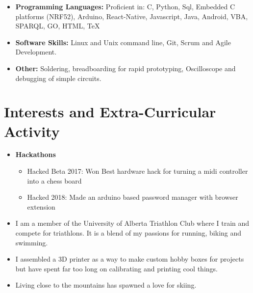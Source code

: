 \documentclass[11pt,a4paper,sans]{moderncv}        %
\begin{document}
\vspace{6pt}

\begin{itemize}

\item \textbf{Programming Languages:} Proficient in: C, Python, Sql, Embedded C platforms (NRF52), Arduino, React-Native, Javascript, Java, Android, VBA, SPARQL, GO, HTML, \TeX

\vspace{6pt}

\item \textbf{Software Skills:} Linux and Unix command line, Git, Scrum and Agile Development.


\vspace{6pt}

\item \textbf{Other:}  Soldering, breadboarding for rapid prototyping, Oscilloscope and debugging of simple circuits.

\end{itemize}

\section{Interests and Extra-Curricular Activity}

\begin{itemize}

\item{\textbf{Hackathons}

\vspace{3pt}

\begin{itemize}
    \item Hacked Beta 2017: Won Best hardware hack for turning a midi controller into a chess board
    \item Hacked 2018: Made an arduino based password manager with browser extension
\end{itemize}
\vspace{6pt}
}



\item{I am a member of the University of Alberta Triathlon Club where I train and compete for triathlons. It is a blend of my passions for running, biking and swimming.}

\item{I assembled a 3D printer as a way to make custom hobby boxes for projects but have spent far too long on calibrating and printing cool things.}

\item{Living close to the mountains has spawned a love for skiing.}

\vspace{6pt}


\end{itemize}
\end{document}
